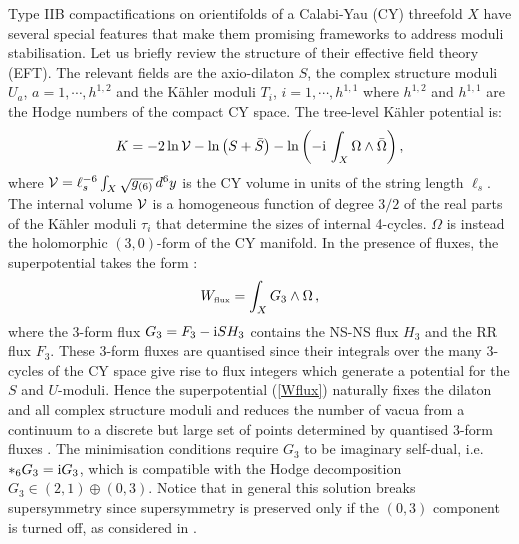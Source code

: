 \documentclass[11pt,a4paper]{article}
\newcommand{\be}{\begin{equation}}
\newcommand{\ee}{\end{equation}}
\newcommand{\vo}{\mathcal{V}}
\def\vo{{{\cal{V}}}}
\def\flux{{\scriptscriptstyle {\rm flux}}}
\begin{document}
Type IIB compactifications on orientifolds of a Calabi-Yau (CY) threefold $X$ have several special features that make them promising frameworks to address moduli stabilisation. Let us briefly review the structure of their effective field theory (EFT). The relevant fields are the axio-dilaton $S$, the complex structure moduli $U_a$, $a=1,\cdots, h^{1,2}$ and the K\"ahler moduli $T_i$, $i=1,\cdots, h^{1,1}$ where $h^{1,2}$ and $h^{1,1}$ are the Hodge numbers of the compact CY space. The tree-level K\"ahler potential is:
\be
K=-2\ln\vo-\ln\left(S+\bar{S}\right)-\ln \left(-{\rm i}\, \int_X \Omega\wedge \bar{\Omega}\right),
\label{Ktree}
\ee
where $\vo = \ell_s^{-6} \int_X \sqrt{g_{(6)}}\, d^6 y$ is the CY volume in units of the string length $\ell_s$. The internal volume $\vo$ is a homogeneous function of degree $3/2$ of the real parts of the K\"ahler moduli $\tau_i$ that determine the sizes of internal 4-cycles. $\Omega$ is instead the holomorphic $(3,0)$-form of the CY manifold. In the presence of fluxes, the superpotential takes the form \cite{Gukov:1999ya}:
\be
W_\flux=\int_X G_3\wedge \Omega\,,
\label{Wflux}
\ee
where the 3-form flux $G_3=F_3-{\rm i}SH_3$ contains the NS-NS flux $H_3$ and the RR flux $F_3$. These 3-form fluxes are quantised since their integrals over 
the many 3-cycles of the CY space give rise to flux integers which generate a potential for the $S$ and $U$-moduli. Hence the superpotential (\ref{Wflux}) naturally fixes the dilaton and all complex structure moduli and reduces the number of vacua from a continuum to a discrete but large set of points determined by quantised 3-form fluxes \cite{Dasgupta:1999ss, Giddings:2001yu}. The minimisation conditions require $G_3$ to be imaginary self-dual, i.e. $*_6 G_3 ={\rm i} G_3$, which is compatible with the Hodge decomposition $G_3\in(2,1)\oplus(0,3)$. Notice that in general this solution breaks supersymmetry since supersymmetry is preserved only if the $(0,3)$ component is turned off, as considered in \cite{Dasgupta:1999ss}.  
\end{document}
